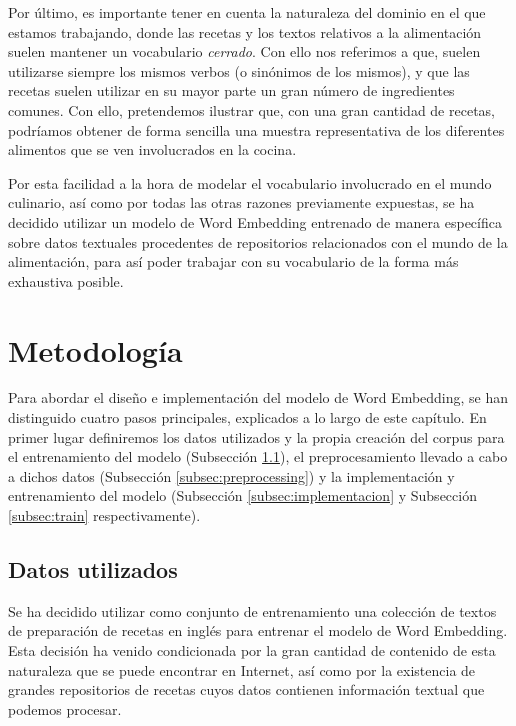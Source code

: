 Por último, es importante tener en cuenta la naturaleza del dominio en el que estamos trabajando, donde las recetas y los textos relativos a la alimentación suelen mantener un vocabulario \textit{cerrado}. Con ello nos referimos a que, suelen utilizarse siempre los mismos verbos (o sinónimos de los mismos), y que las recetas suelen utilizar en su mayor parte un gran número de ingredientes comunes. Con ello, pretendemos ilustrar que, con una gran cantidad de recetas, podríamos obtener de forma sencilla una muestra representativa de los diferentes alimentos que se ven involucrados en la cocina. 

Por esta facilidad a la hora de modelar el vocabulario involucrado en el mundo culinario, así como por todas las otras razones previamente expuestas, se ha decidido utilizar un modelo de Word Embedding entrenado de manera específica sobre datos textuales procedentes de repositorios relacionados con el mundo de la alimentación, para así poder trabajar con su vocabulario de la forma más exhaustiva posible. 

\section{Metodología}

Para abordar el diseño e implementación del modelo de Word Embedding, se han distinguido cuatro pasos principales, explicados a lo largo de este capítulo. En primer lugar definiremos los datos utilizados y la propia creación del corpus para el entrenamiento del modelo (Subsección \ref{subsec:datos}), el preprocesamiento llevado a cabo a dichos datos (Subsección \ref{subsec:preprocessing}) y la implementación y entrenamiento del modelo (Subsección \ref{subsec:implementacion} y Subsección \ref{subsec:train} respectivamente).

\subsection{Datos utilizados}\label{subsec:datos}

Se ha decidido utilizar como conjunto de entrenamiento una colección de textos de preparación de recetas en inglés para entrenar el modelo de Word Embedding. Esta decisión ha venido condicionada por la gran cantidad de contenido de esta naturaleza que se puede encontrar en Internet, así como por la existencia de grandes repositorios de recetas cuyos datos contienen información textual que podemos procesar. 

